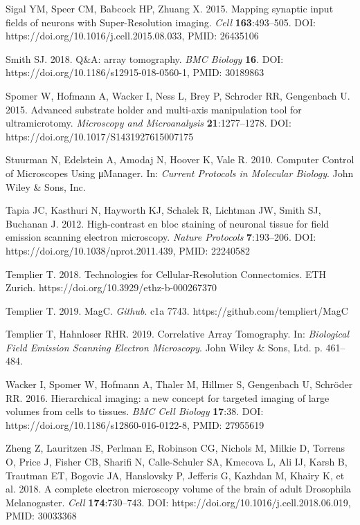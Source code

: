 \documentclass{article}
\newenvironment{reflist}{\par\small\setlength{\parindent}{0pt}\everypar{\hangindent=2.2em\hangafter=1}}{\par}
\begin{document}
\begin{reflist}
Sigal YM, Speer CM, Babcock HP, Zhuang X. 2015. Mapping synaptic input fields of neurons with Super-Resolution imaging. \emph{Cell} \textbf{163}:493–505. DOI: https://doi.org/10.1016/j.cell.2015.08.033, PMID: 26435106

Smith SJ. 2018. Q\&A: array tomography. \emph{BMC Biology} \textbf{16}. DOI: https://doi.org/10.1186/s12915-018-0560-1, PMID: 30189863

Spomer W, Hofmann A, Wacker I, Ness L, Brey P, Schroder RR, Gengenbach U. 2015. Advanced substrate holder and multi-axis manipulation tool for ultramicrotomy. \emph{Microscopy and Microanalysis} \textbf{21}:1277–1278. DOI: https://doi.org/10.1017/S1431927615007175

Stuurman N, Edelstein A, Amodaj N, Hoover K, Vale R. 2010. Computer Control of Microscopes Using μManager. In: \emph{Current Protocols in Molecular Biology}. John Wiley \& Sons, Inc.

Tapia JC, Kasthuri N, Hayworth KJ, Schalek R, Lichtman JW, Smith SJ, Buchanan J. 2012. High-contrast en bloc staining of neuronal tissue for field emission scanning electron microscopy. \emph{Nature Protocols} \textbf{7}:193–206. DOI: https://doi.org/10.1038/nprot.2011.439, PMID: 22240582

Templier T. 2018. Technologies for Cellular-Resolution Connectomics. ETH Zurich. https://doi.org/10.3929/ethz-b-000267370

Templier T. 2019. MagC. \emph{Github}. c1a 7743. https://github.com/templiert/MagC

Templier T, Hahnloser RHR. 2019. Correlative Array Tomography. In: \emph{Biological Field Emission Scanning Electron Microscopy}. John Wiley \& Sons, Ltd. p. 461–484.

Wacker I, Spomer W, Hofmann A, Thaler M, Hillmer S, Gengenbach U, Schröder RR. 2016. Hierarchical imaging: a new concept for targeted imaging of large volumes from cells to tissues. \emph{BMC Cell Biology} \textbf{17}:38. DOI: https://doi.org/10.1186/s12860-016-0122-8, PMID: 27955619

Zheng Z, Lauritzen JS, Perlman E, Robinson CG, Nichols M, Milkie D, Torrens O, Price J, Fisher CB, Sharifi N, Calle-Schuler SA, Kmecova L, Ali IJ, Karsh B, Trautman ET, Bogovic JA, Hanslovsky P, Jefferis G, Kazhdan M, Khairy K, et al. 2018. A complete electron microscopy volume of the brain of adult Drosophila Melanogaster. \emph{Cell} \textbf{174}:730–743. DOI: https://doi.org/10.1016/j.cell.2018.06.019, PMID: 30033368
\end{reflist}
\end{document}
